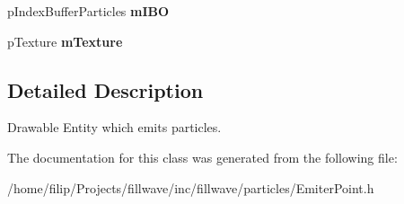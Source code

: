 \begin{DoxyCompactItemize}
\item 
\hypertarget{classfillwave_1_1particles_1_1EmiterPoint_ae07905d07f70c71c172bd1339fc5b792}{}p\+Index\+Buffer\+Particles {\bfseries m\+I\+B\+O}\label{classfillwave_1_1particles_1_1EmiterPoint_ae07905d07f70c71c172bd1339fc5b792}

\item 
\hypertarget{classfillwave_1_1particles_1_1EmiterPoint_a8f1d516b9bc56d37f9c9acb422ea2a16}{}p\+Texture {\bfseries m\+Texture}\label{classfillwave_1_1particles_1_1EmiterPoint_a8f1d516b9bc56d37f9c9acb422ea2a16}

\end{DoxyCompactItemize}


\subsection{Detailed Description}
Drawable Entity which emits particles. 

The documentation for this class was generated from the following file\+:\begin{DoxyCompactItemize}
\item 
/home/filip/\+Projects/fillwave/inc/fillwave/particles/Emiter\+Point.\+h\end{DoxyCompactItemize}
